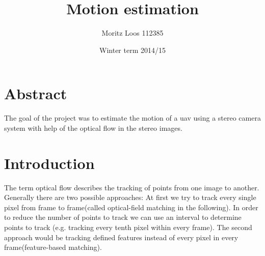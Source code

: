 \documentclass[11pt]{article}
\title{\textbf{Motion estimation}}
\author{ Moritz Loos 112385 }
\date{ Winter term 2014/15 }
\begin{document}
	
	
	\maketitle

	\section{Abstract}
	The goal of the project was to estimate the motion of a uav using a stereo camera system with help of the optical flow in the stereo images.

	\section{Introduction}
	The term optical flow describes the tracking of points from one image to another. Generally there are two possible approaches:
	At first we try to track every single pixel from frame to frame(called optical-field matching in the following). In order to reduce the number of points to track we can use an interval to determine points to track (e.g. tracking every tenth pixel within every frame). The second approach would be tracking defined features instead of every pixel in every frame(feature-based matching).
	
\end{document}
